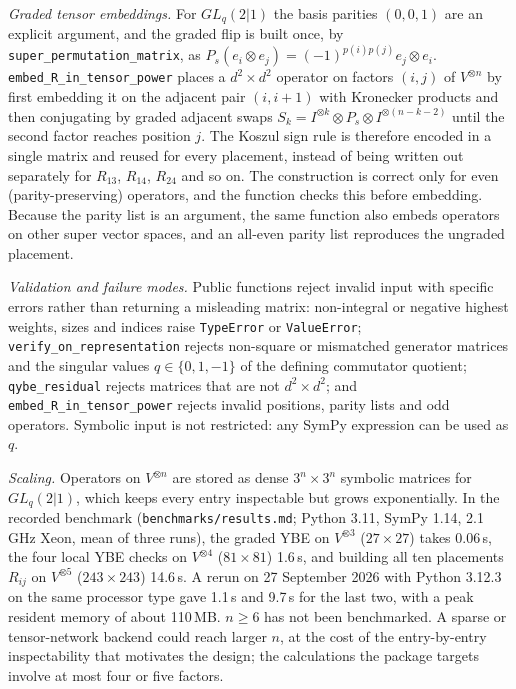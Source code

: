 \documentclass[11pt,a4paper]{article}
\newcommand{\code}[1]{\texttt{#1}}
\newcommand{\GL}{GL_q(2|1)}
\begin{document}
\emph{Graded tensor embeddings.} For $\GL$ the basis parities $(0,0,1)$ are an explicit argument, and the graded flip is built once, by \code{super\_permutation\_matrix}, as $P_s(e_i\otimes e_j)=(-1)^{p(i)p(j)}e_j\otimes e_i$. \code{embed\_R\_in\_tensor\_power} places a $d^2\times d^2$ operator on factors $(i,j)$ of $V^{\otimes n}$ by first embedding it on the adjacent pair $(i,i+1)$ with Kronecker products and then conjugating by graded adjacent swaps $S_k=I^{\otimes k}\otimes P_s\otimes I^{\otimes(n-k-2)}$ until the second factor reaches position $j$. The Koszul sign rule is therefore encoded in a single matrix and reused for every placement, instead of being written out separately for $R_{13}$, $R_{14}$, $R_{24}$ and so on. The construction is correct only for even (parity-preserving) operators, and the function checks this before embedding. Because the parity list is an argument, the same function also embeds operators on other super vector spaces, and an all-even parity list reproduces the ungraded placement.

\emph{Validation and failure modes.} Public functions reject invalid input with specific errors rather than returning a misleading matrix: non-integral or negative highest weights, sizes and indices raise \code{TypeError} or \code{ValueError}; \code{verify\_on\_representation} rejects non-square or mismatched generator matrices and the singular values $q\in\{0,1,-1\}$ of the defining commutator quotient; \code{qybe\_residual} rejects matrices that are not $d^2\times d^2$; and \code{embed\_R\_in\_tensor\_power} rejects invalid positions, parity lists and odd operators. Symbolic input is not restricted: any SymPy expression can be used as $q$.

\emph{Scaling.} Operators on $V^{\otimes n}$ are stored as dense $3^n\times3^n$ symbolic matrices for $\GL$, which keeps every entry inspectable but grows exponentially. In the recorded benchmark (\code{benchmarks/results.md}; Python 3.11, SymPy 1.14, 2.1\,GHz Xeon, mean of three runs), the graded YBE on $V^{\otimes3}$ ($27\times27$) takes 0.06\,s, the four local YBE checks on $V^{\otimes4}$ ($81\times81$) 1.6\,s, and building all ten placements $R_{ij}$ on $V^{\otimes5}$ ($243\times243$) 14.6\,s. A rerun on 27 September 2026 with Python 3.12.3 on the same processor type gave 1.1\,s and 9.7\,s for the last two, with a peak resident memory of about 110\,MB. $n\geq6$ has not been benchmarked. A sparse or tensor-network backend could reach larger $n$, at the cost of the entry-by-entry inspectability that motivates the design; the calculations the package targets involve at most four or five factors.
\end{document}
